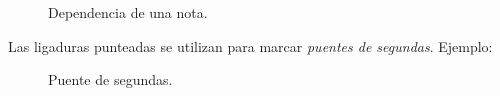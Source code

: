 \begin{figure}[H]
\centering
{}
\caption*{Dependencia de una nota.}\label{prefig:dependencia}
\end{figure}

Las ligaduras punteadas se utilizan para marcar \emph{puentes de segundas}. Ejemplo:

\begin{figure}[H]
\centering
{}
\caption*{Puente de segundas.}
\label{prefig:puente}
\end{figure}
